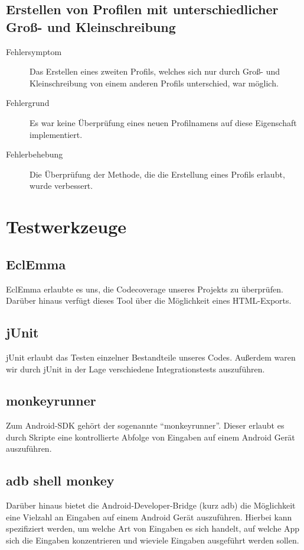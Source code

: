 \documentclass[parskip=full]{scrreprt}
\begin{document}
\section{Erstellen von Profilen mit unterschiedlicher Groß- und Kleinschreibung}
\begin{description}
	\item[Fehlersymptom] Das Erstellen eines zweiten Profils, welches sich nur durch Groß- und Kleinschreibung von einem anderen Profils unterschied, war möglich.
	\item[Fehlergrund] Es war keine Überprüfung eines neuen Profilnamens auf diese Eigenschaft implementiert.
	\item[Fehlerbehebung] Die Überprüfung der Methode, die die Erstellung eines Profils erlaubt, wurde verbessert.
\end{description}

\chapter{Testwerkzeuge}

\section{EclEmma}

EclEmma erlaubte es uns, die Codecoverage unseres Projekts zu überprüfen. Darüber hinaus verfügt dieses Tool über die Möglichkeit eines HTML-Exports.

\section{jUnit}

jUnit erlaubt das Testen einzelner Bestandteile unseres Codes. Außerdem waren wir durch jUnit in der Lage verschiedene Integrationstests auszuführen.

\section{monkeyrunner}

Zum Android-SDK gehört der sogenannte \enquote{monkeyrunner}. Dieser erlaubt es durch Skripte eine kontrollierte Abfolge von Eingaben auf einem Android Gerät auszuführen.

\section{adb shell monkey}

Darüber hinaus bietet die Android-Developer-Bridge (kurz adb) die Möglichkeit eine Vielzahl an Eingaben auf einem Android Gerät auszuführen. Hierbei kann spezifiziert werden, um welche Art von Eingaben es sich handelt, auf welche App sich die Eingaben konzentrieren und wieviele Eingaben ausgeführt werden sollen.
\end{document}
